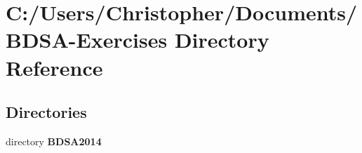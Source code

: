 \section{C\+:/\+Users/\+Christopher/\+Documents/\+B\+D\+S\+A-\/\+Exercises Directory Reference}
\label{dir_227b133dad10a1885a7d6e53104ac944}
\subsection*{Directories}
\begin{DoxyCompactItemize}
\item 
directory {\bf B\+D\+S\+A2014}
\end{DoxyCompactItemize}
